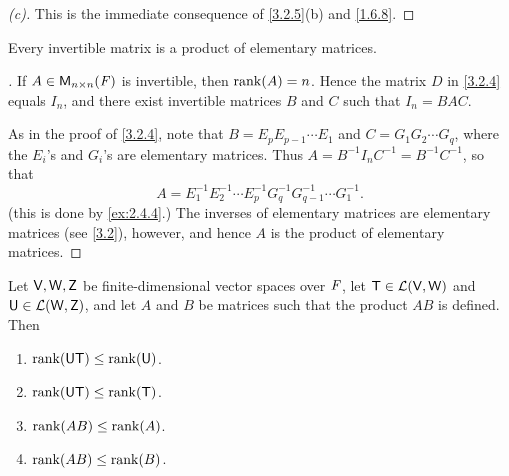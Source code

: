 \begin{proof}[(c)]
	This is the immediate consequence of \cref{3.2.5}(b) and \cref{1.6.8}.
\end{proof}

\begin{cor}\label{3.2.6}
	Every invertible matrix is a product of elementary matrices.
\end{cor}

\begin{proof}[]
	If \(A \in \ms[n][n][\F]\) is invertible, then \(\rk{A} = n\).
	Hence the matrix \(D\) in \cref{3.2.4} equals \(I_n\), and there exist invertible matrices \(B\) and \(C\) such that \(I_n = BAC\).

	As in the proof of \cref{3.2.4}, note that \(B = E_p E_{p - 1} \cdots E_1\) and \(C = G_1 G_2 \cdots G_q\), where the \(E_i\)'s and \(G_i\)'s are elementary matrices.
	Thus \(A = B^{-1} I_n C^{-1} = B^{-1} C^{-1}\), so that
	\[
		A = E_1^{-1} E_2^{-1} \cdots E_p^{-1} G_q^{-1} G_{q - 1}^{-1} \cdots G_1^{-1}.
	\]
	(this is done by \cref{ex:2.4.4}.)
	The inverses of elementary matrices are elementary matrices (see \cref{3.2}), however, and hence \(A\) is the product of elementary matrices.
\end{proof}

\begin{thm}\label{3.7}
	Let \(\mathsf{V}, \mathsf{W}, \mathsf{Z}\) be finite-dimensional vector spaces over \(\mathit{F}\), let \(\mathsf{T} \in \mathcal{L}(\mathsf{V}, \mathsf{W})\) and \(\mathsf{U} \in \mathcal{L}(\mathsf{W}, \mathsf{Z})\), and let \(A\) and \(B\) be matrices such that the product \(AB\) is defined.
	Then
	\begin{enumerate}
		\item \(\rk{\U \T} \leq \rk{\U}\).
		\item \(\rk{\U \T} \leq \rk{\T}\).
		\item \(\rk{AB} \leq \rk{A}\).
		\item \(\rk{AB} \leq \rk{B}\).
	\end{enumerate}
\end{thm}

